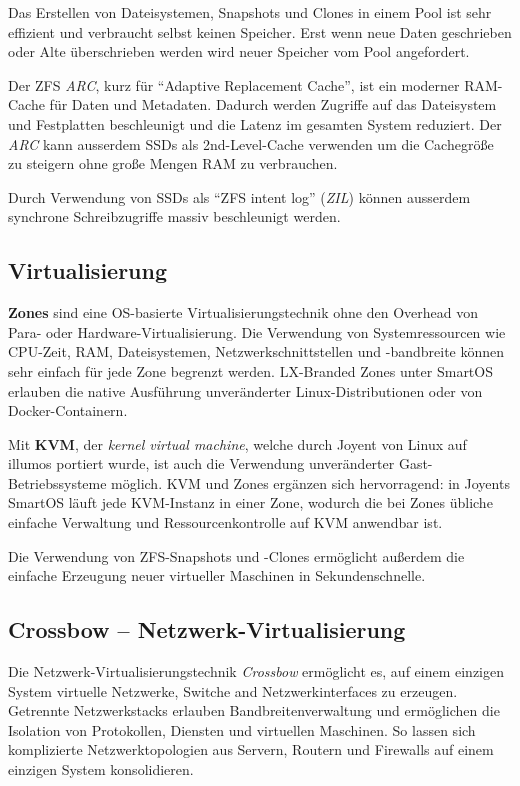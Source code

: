 \documentclass[11pt,foldmark,notumble]{leaflet}
\begin{document}
Das Erstellen von Dateisystemen, Snapshots und Clones in einem Pool
ist sehr effizient und verbraucht selbst keinen Speicher. Erst wenn
neue Daten geschrieben oder Alte überschrieben werden wird neuer
Speicher vom Pool angefordert.

Der ZFS \emph{ARC}, kurz für ``Adaptive Replacement Cache'', ist ein
moderner RAM-Cache für Daten und Metadaten. Dadurch werden Zugriffe
auf das Dateisystem und Festplatten beschleunigt und die Latenz im
gesamten System reduziert. Der \emph{ARC} kann ausserdem SSDs als
2nd-Level-Cache verwenden um die Cachegröße zu steigern ohne große
Mengen RAM zu verbrauchen.

Durch Verwendung von SSDs als ``ZFS intent log'' (\emph{ZIL}) können
ausserdem synchrone Schreibzugriffe massiv beschleunigt werden.

\subsection{Virtualisierung}
\textbf{Zones} sind eine OS-basierte Virtualisierungstechnik ohne den
Overhead von Para- oder Hardware-Virtualisierung. Die Verwendung von
Systemressourcen wie CPU-Zeit, RAM, Dateisystemen,
Netzwerkschnittstellen und -bandbreite können sehr einfach für jede
Zone begrenzt werden. LX-Branded Zones unter SmartOS erlauben die
native Ausführung unveränderter Linux-Distributionen oder von
Docker-Containern.

Mit \textbf{KVM}, der \emph{kernel virtual machine}, welche durch
Joyent von Linux auf illumos portiert wurde, ist auch die Verwendung
unveränderter Gast-Betriebssysteme möglich. KVM und Zones ergänzen
sich hervorragend: in Joyents SmartOS läuft jede KVM-Instanz in einer
Zone, wodurch die bei Zones übliche einfache Verwaltung und
Ressourcenkontrolle auf KVM anwendbar ist.

Die Verwendung von ZFS-Snapshots und -Clones ermöglicht außerdem die
einfache Erzeugung neuer virtueller Maschinen in Sekundenschnelle.

\subsection{Crossbow -- Netzwerk-Virtualisierung}
Die Netzwerk-Virtualisierungstechnik \emph{Crossbow} ermöglicht es,
auf einem einzigen System virtuelle Netzwerke, Switche and
Netzwerkinterfaces zu erzeugen. Getrennte Netzwerkstacks erlauben
Bandbreitenverwaltung und ermöglichen die Isolation von Protokollen,
Diensten und virtuellen Maschinen. So lassen sich komplizierte
Netzwerktopologien aus Servern, Routern und Firewalls auf einem
einzigen System konsolidieren.
\end{document}
